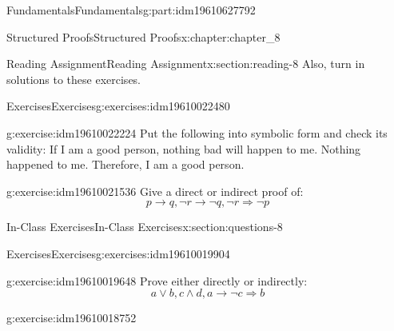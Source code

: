 \documentclass[oneside,10pt,]{book}
\numberwithin{equation}{section}
\begin{document}
\begin{partptx}{Fundamentals}{}{Fundamentals}{}{}{g:part:idm19610627792}
\begin{chapterptx}{Structured Proofs}{}{Structured Proofs}{}{}{x:chapter:chapter_8}
\begin{sectionptx}{Reading Assignment}{}{Reading Assignment}{}{}{x:section:reading-8}
Also, turn in solutions to these exercises.%
%
%
\typeout{************************************************}
\typeout{************************************************}
%
\begin{exercises-subsection-numberless}{Exercises}{}{Exercises}{}{}{g:exercises:idm19610022480}
\par\medskip\noindent%
%
\begin{exercisegroup}
\begin{divisionexerciseeg}{1}{}{}{g:exercise:idm19610022224}%
Put the following into symbolic form and check its validity: If I am a good person, nothing bad will happen to me. Nothing happened to me. Therefore, I am a good person.%
\end{divisionexerciseeg}%
\begin{divisionexerciseeg}{2}{}{}{g:exercise:idm19610021536}%
Give  a direct or indirect proof of:%
\begin{equation*}
p\rightarrow  q, \neg r\rightarrow  \neg q, \neg r \Rightarrow  \neg p
\end{equation*}
%
\end{divisionexerciseeg}%
\end{exercisegroup}
\par\medskip\noindent
\end{exercises-subsection-numberless}
\end{sectionptx}
%
%
\typeout{************************************************}
\typeout{************************************************}
%
\begin{sectionptx}{In-Class Exercises}{}{In-Class Exercises}{}{}{x:section:questions-8}
%
%
%
\typeout{************************************************}
\typeout{************************************************}
%
\begin{exercises-subsection-numberless}{Exercises}{}{Exercises}{}{}{g:exercises:idm19610019904}
\par\medskip\noindent%
%
\begin{exercisegroup}
\begin{divisionexerciseeg}{1}{}{}{g:exercise:idm19610019648}%
Prove either directly or indirectly:%
\begin{equation*}
a \lor  b, c \land  d, a \rightarrow  \neg c \Rightarrow  b
\end{equation*}
%
\end{divisionexerciseeg}%
\begin{divisionexerciseeg}{2}{}{}{g:exercise:idm19610018752}%

\end{divisionexerciseeg}
\end{exercisegroup}
\end{exercises-subsection-numberless}
\end{sectionptx}
\end{chapterptx}
\end{partptx}
\end{document}
